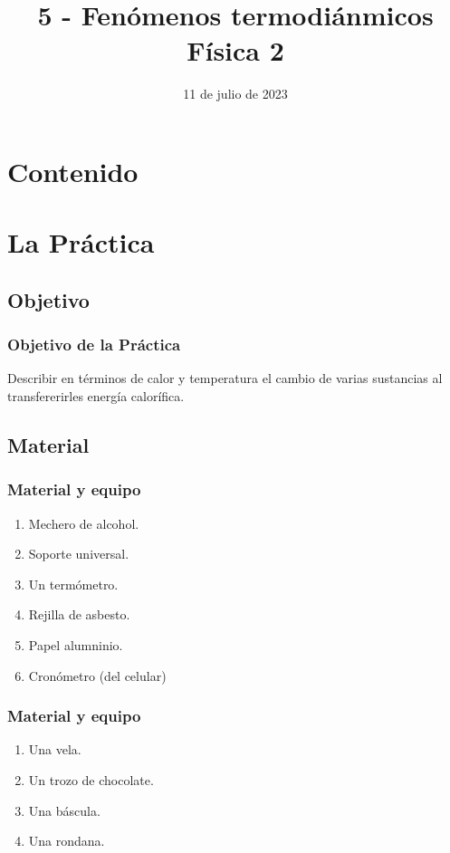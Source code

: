 \documentclass[14pt]{beamer}
\title{\Large{5 - Fenómenos termodiánmicos} \\ \normalsize{Física 2}}
\date{11 de julio de 2023}
\begin{document}
\maketitle

\section*{Contenido}

\section{La Práctica}
\subsection{Objetivo}

\begin{frame}
\frametitle{Objetivo de la Práctica}
Describir en términos de calor y temperatura el cambio de varias sustancias al transfererirles energía calorífica.
\end{frame}

\subsection{Material}

\begin{frame}
\frametitle{Material y equipo}
\begin{enumerate}[<+->]
\item Mechero de alcohol.
\item Soporte universal.
\item Un termómetro.
\item Rejilla de asbesto.
\item Papel alumninio.
\item Cronómetro (del celular)
\seti
\end{enumerate}
\end{frame}
\begin{frame}
\frametitle{Material y equipo}
\begin{enumerate}[<+->]
\conti    
\item Una vela.
\item Un trozo de chocolate.
\item Una báscula.
\item Una rondana.
\end{enumerate}
\end{frame}
\end{document}
